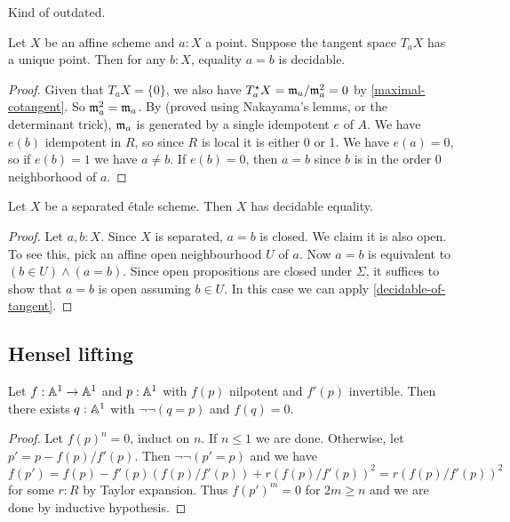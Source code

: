 Kind of outdated.

\begin{proposition}%
	\label{decidable-of-tangent}
	Let $X$ be an affine scheme and $a : X$ a point. Suppose the tangent space
	$T_a X$ has a unique point. Then for any $b : X$, equality $a = b$ is decidable.
\end{proposition}

\begin{proof}
	Given that $T_a X = \{0\}$, we also have $T^\star_a X = \mathfrak{m}_a / \mathfrak{m}_a^2 = 0$
	by \cref{maximal-cotangent}.
	So $\mathfrak{m}_a^2 = \mathfrak{m}_a$. By \cite[Lemma II.4.6]{lombardi-quitte}
	(proved using Nakayama's lemms, or the determinant trick), $\mathfrak{m}_a$ is generated
	by a single idempotent $e$ of $A$. We have $e(b)$ idempotent in $R$,
	so since $R$ is local it is either 0 or 1. We have $e(a) = 0$, so if $e(b) = 1$
	we have $a \ne b$. If $e(b) = 0$, then $a = b$ since $b$ is in the order 0
	neighborhood of $a$.
\end{proof}

\begin{proposition}%
	Let $X$ be a separated \'{e}tale scheme. Then $X$ has decidable equality.
\end{proposition}

\begin{proof}
	Let $a, b : X$. Since $X$ is separated, $a = b$ is closed.
	We claim it is also open.
	To see this, pick an affine open neighbourhood $U$ of $a$.
	Now $a = b$ is equivalent to $(b \in U) \wedge (a = b)$.
	Since open propositions are closed under $\Sigma$,
	it suffices to show that $a = b$ is open assuming $b \in U$.
	In this case we can apply \cref{decidable-of-tangent}.
\end{proof}

\subsection{Hensel lifting}

\begin{lemma}
  Let $f : \mathbb{A}^1 \to \mathbb{A}^1$ and
  $p : \mathbb{A}^1$ with $f(p)$ nilpotent and
  $f'(p)$ invertible.
  Then there exists $q : \mathbb{A}^1$
  with $\lnot \lnot (q = p)$
  and $f(q) = 0$.
\end{lemma}

\begin{proof}
  Let $f(p)^n = 0$, induct on $n$.
  If $n \leq 1$ we are done.
  Otherwise, let $p' = p - f(p)/f'(p)$.
  Then $\lnot \lnot (p' = p)$ and we have
  \[ f(p')
     = f(p) - f'(p) (f(p)/f'(p)) + r (f(p)/f'(p))^2
     = r (f(p)/f'(p))^2 \]
  for some $r : R$
  by Taylor expansion.
  Thus ${f(p')}^m = 0$ for $2m \geq n$
  and we are done by inductive hypothesis.
\end{proof}
